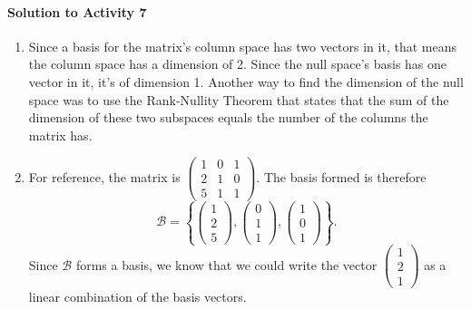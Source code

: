 \paragraph{Solution to Activity 7}
\begin{enumerate}
	\item Since a basis for the matrix's column space has two vectors in it, that means the column space has a dimension of 2. Since the null space's basis has one vector in it, it's
		of dimension 1. Another way to find the dimension of the null space was to use the Rank-Nullity Theorem that states that the sum of the dimension of these two 
		subspaces equals the number of the columns the matrix has.
	\item For reference, the matrix is \(\begin{pmatrix}1 & 0 & 1 \\ 2 & 1 & 0 \\ 5 & 1 & 1\end{pmatrix}.\) The basis formed is therefore 
		\[\mathcal{B} = \left\{\!\begin{pmatrix}1 \\ 2 \\ 5\end{pmatrix}, \begin{pmatrix}0 \\ 1 \\ 1\end{pmatrix}, \begin{pmatrix}1 \\ 0 \\ 1\end{pmatrix}\!\right\}.\]
		Since \(\mathcal{B}\) forms a basis, we know that we could write the vector \(\begin{pmatrix}1 \\ 2 \\ 1\end{pmatrix}\) as a linear combination of the basis vectors.

\end{enumerate}
